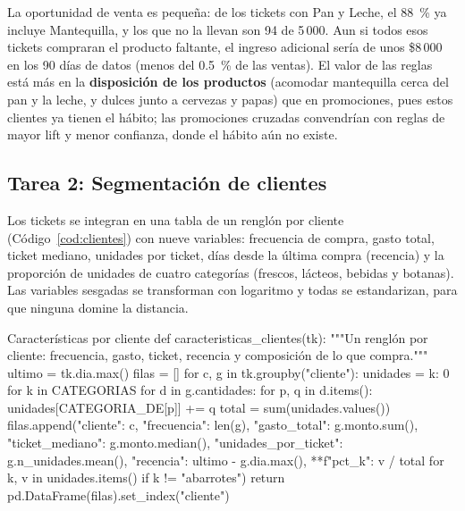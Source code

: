 \documentclass[11pt,letterpaper]{article}
\begin{document}
La oportunidad de venta es pequeña: de los tickets con Pan y Leche, el 88~\% ya incluye Mantequilla, y los que no la llevan son 94 de 5\,000. Aun si todos esos tickets compraran el producto faltante, el ingreso adicional sería de unos \$8\,000 en los 90 días de datos (menos del 0.5~\% de las ventas). El valor de las reglas está más en la \textbf{disposición de los productos} (acomodar mantequilla cerca del pan y la leche, y dulces junto a cervezas y papas) que en promociones, pues estos clientes ya tienen el hábito; las promociones cruzadas convendrían con reglas de mayor lift y menor confianza, donde el hábito aún no existe.

\subsection{Tarea 2: Segmentación de clientes}

Los tickets se integran en una tabla de un renglón por cliente (Código~\ref{cod:clientes}) con nueve variables: frecuencia de compra, gasto total, ticket mediano, unidades por ticket, días desde la última compra (recencia) y la proporción de unidades de cuatro categorías (frescos, lácteos, bebidas y botanas). Las variables sesgadas se transforman con logaritmo y todas se estandarizan, para que ninguna domine la distancia.

\begin{codigo}[label=cod:clientes]{Características por cliente}
def caracteristicas_clientes(tk):
    """Un renglón por cliente: frecuencia, gasto, ticket, recencia y composición de lo que compra."""
    ultimo = tk.dia.max()
    filas = []
    for c, g in tk.groupby("cliente"):
        unidades = {k: 0 for k in CATEGORIAS}
        for d in g.cantidades:
            for p, q in d.items():
                unidades[CATEGORIA_DE[p]] += q
        total = sum(unidades.values())
        filas.append({"cliente": c, "frecuencia": len(g), "gasto_total": g.monto.sum(), "ticket_mediano": g.monto.median(),
                      "unidades_por_ticket": g.n_unidades.mean(), "recencia": ultimo - g.dia.max(),
                      **{f"pct_{k}": v / total for k, v in unidades.items() if k != "abarrotes"}})
    return pd.DataFrame(filas).set_index("cliente")
\end{codigo}
\end{document}
